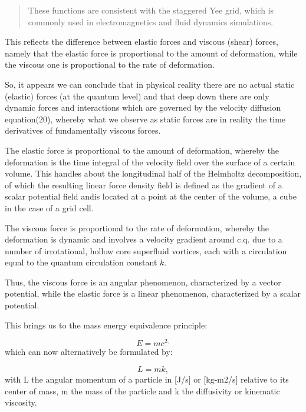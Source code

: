 \documentclass[twoside,final]{article}
\begin{document}
{\begin{quote}
These functions are consistent with the staggered Yee grid, which is commonly
used in electromagnetics and fluid dynamics simulations.

\end{quote}


This reflects the difference between elastic forces and viscous (shear) forces,
namely that the  elastic force is proportional to the amount of deformation,
while the viscous one is proportional to the rate of deformation. 

So, it appears
we can conclude that in physical reality there are no actual static (elastic)
forces (at the quantum level) and that deep down there are only dynamic forces
and interactions which are governed by the velocity diffusion equation(20),
whereby what we observe as static forces are in reality the time derivatives of
fundamentally viscous forces.




The elastic force is proportional to the amount of deformation, whereby the
deformation is the time integral of the velocity field over the surface of
a certain volume. This handles about the longitudinal half of the Helmholtz
decomposition, of which the resulting linear force density field is defined
as the gradient of a scalar potential field andis located at a point at the 
center of the volume, a cube in the case of a grid cell.

The viscous force is proportional to the rate of deformation, whereby the
deformation is dynamic and involves a velocity gradient around c.q. due to a
number of irrotational, hollow core superfluid vortices, each with a circulation
equal to the quantum circulation constant $k$. 

Thus, the viscous force is an angular phenomenon, characterized by a vector
potential, while the elastic force is a linear phenomenon, characterized 
by a scalar potential.






This brings us to the mass energy equivalence principle:

\begin{equation}
E=\mathit{mc}^{2,}
\end{equation}
which can now alternatively be formulated by:

\begin{equation}\label{seq:refText28}
L=mk,
\end{equation}
with L the angular momentum of a particle in [J/s] or [kg-m2/s] relative to its center of mass, m the mass of the
particle and k the diffusivity or kinematic viscosity. 

}
\end{document}
